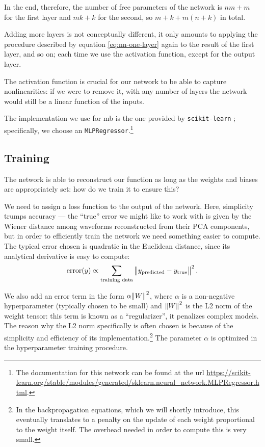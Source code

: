 \documentclass[main.tex]{subfiles}
\begin{document}
In the end, therefore, the number of free parameters of the network is \(nm + m\) for the first layer and \(mk + k\) for the second, so \(m + k + m (n+k)\) in total.

Adding more layers is not conceptually different, it only amounts to applying the procedure described by equation \ref{eq:nn-one-layer} again to the result of the first layer, and so on; each time we use the activation function, except for the output layer.

The activation function is crucial for our network to be able to capture nonlinearities: if we were to remove it, with any number of layers the network would still be a linear function of the inputs. 

The implementation we use for \acs{mb} is the one provided by \texttt{scikit-learn} \cite[]{pedregosaScikitlearnMachineLearning2011}; specifically, we choose an \texttt{MLPRegressor}.\footnote{The documentation for this network can be found at the url \url{https://scikit-learn.org/stable/modules/generated/sklearn.neural_network.MLPRegressor.html}.} 

\subsection{Training}

The network is able to reconstruct our function as long as the weights and biases are appropriately set: how do we train it to ensure this? 

We need to assign a loss function to the output of the network.
Here, simplicity trumps accuracy --- the ``true'' error we might like to work with is given by the Wiener distance among waveforms reconstructed from their PCA components, but in order to efficiently train the network we need something easier to compute.
The typical error chosen is quadratic in the Euclidean distance, since its analytical derivative is easy to compute: 
%
\begin{align} \label{eq:quadratic-loss}
\text{error}(y) \propto \sum _{\text{training data}} 
\norm{y _{\text{predicted}} - y _{\text{true}}}^2
\,.
\end{align}

We also add an error term in the form \(\alpha \norm{W}^2\), where \(\alpha \) is a non-negative hyperparameter (typically chosen to be small) and \(\norm{W}^2\) is the L2 norm of the weight tensor: this term is known as a ``regularizer'', it penalizes complex models.
The reason why the L2 norm specifically is often chosen is because of the simplicity and efficiency of its implementation.\footnote{In the backpropagation equations, which we will shortly introduce, this eventually translates to a penalty on the update of each weight proportional to the weight itself. The overhead needed in order to compute this is very small.}
The parameter \(\alpha \) is optimized in the hyperparameter training procedure. 
\end{document}
